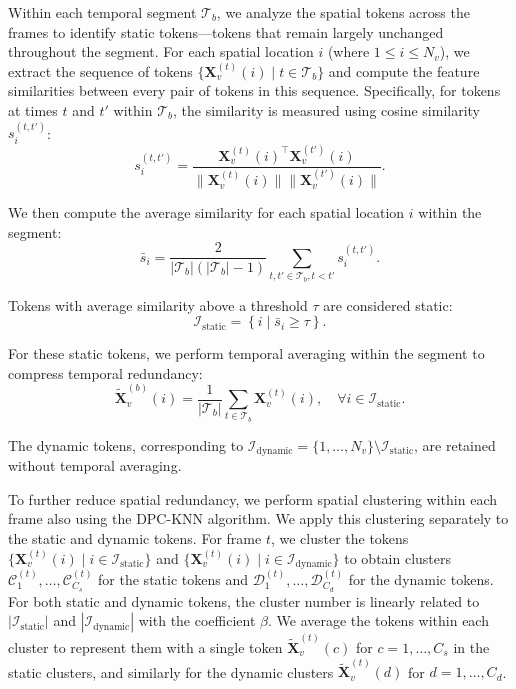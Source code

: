 \documentclass{article} %
\begin{document}
Within each temporal segment $\mathcal{T}_b$, we analyze the spatial tokens across the frames to identify static tokens—tokens that remain largely unchanged throughout the segment. For each spatial location $i$ (where $1 \leq i \leq N_v$), we extract the sequence of tokens $\{\bm{X}_v^{(t)}(i) \mid t \in \mathcal{T}_b\}$ and compute the feature similarities between every pair of tokens in this sequence. Specifically, for tokens at times $t$ and $t'$ within $\mathcal{T}_b$, the similarity is measured using cosine similarity $s_{i}^{(t,t')}$:
\begin{equation}
    s_{i}^{(t,t')} = \frac{\bm{X}_v^{(t)}(i)^\top \bm{X}_v^{(t')}(i)}{\| \bm{X}_v^{(t)}(i) \| \| \bm{X}_v^{(t')}(i) \|}.
\end{equation}

We then compute the average similarity for each spatial location $i$ within the segment:
\begin{equation}
    \bar{s}_i = \frac{2}{|\mathcal{T}_b|(|\mathcal{T}_b| - 1)} \sum_{t, t' \in \mathcal{T}_b, t < t'} s_{i}^{(t,t')}.
\end{equation}

Tokens with average similarity above a threshold $\tau$ are considered static:
\begin{equation}
    \mathcal{I}_\text{static} = \left\{ i \mid \bar{s}_i \geq \tau \right\}.
\end{equation}

For these static tokens, we perform temporal averaging within the segment to compress temporal redundancy:
\begin{equation}
    \tilde{\bm{X}}_v^{(b)}(i) = \frac{1}{|\mathcal{T}_b|} \sum_{t \in \mathcal{T}_b} \bm{X}_v^{(t)}(i), \quad \forall i \in \mathcal{I}_\text{static}.
\end{equation}

The dynamic tokens, corresponding to $\mathcal{I}_\text{dynamic} = \{1, \dots, N_v\} \setminus \mathcal{I}_\text{static}$, are retained without temporal averaging.

To further reduce spatial redundancy, we perform spatial clustering within each frame also using the DPC-KNN algorithm. We apply this clustering separately to the static and dynamic tokens. For frame $t$, we cluster the tokens $\{\bm{X}_v^{(t)}(i) \mid i \in \mathcal{I}_\text{static}\}$ and $\{\bm{X}_v^{(t)}(i) \mid i \in \mathcal{I}_\text{dynamic}\}$ to obtain clusters $\mathcal{C}_1^{(t)}, \dots, \mathcal{C}_{C_s}^{(t)}$ for the static tokens and $\mathcal{D}_1^{(t)}, \dots, \mathcal{D}_{C_d}^{(t)}$ for the dynamic tokens. For both static and dynamic tokens, the cluster number is linearly related to $|\mathcal{I}_\text{static}|$ and $|\mathcal{I}_\text{dynamic}|$ with the coefficient $\beta$. We average the tokens within each cluster to represent them with a single token $\tilde{\bm{X}}_v^{(t)}(c)$ for $c = 1, \dots, C_s$ in the static clusters, and similarly for the dynamic clusters $\tilde{\bm{X}}_v^{(t)}(d)$ for $d = 1, \dots, C_d$.
\end{document}
